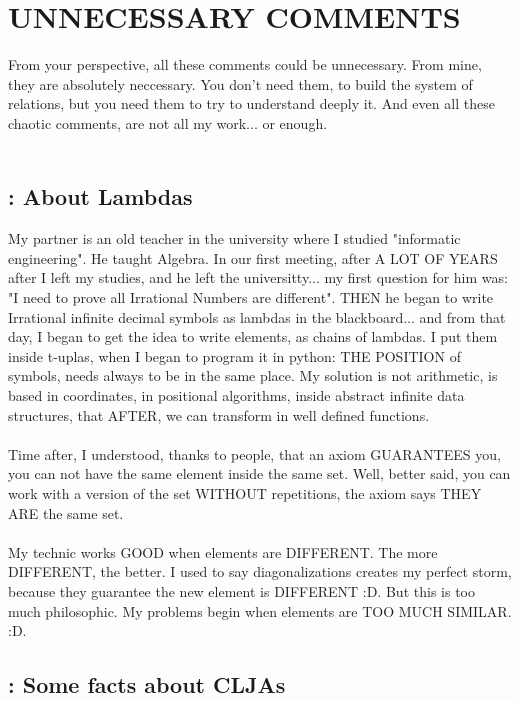 \chapter{UNNECESSARY COMMENTS}
	
	\noindent
	From your perspective, all these comments could be unnecessary. From mine, they are absolutely neccessary. You don't need them, to build the system of relations, but you need them to try to understand deeply it. And even all these chaotic comments, are not all my work... or enough.
	\\\\
	
	\section{\:: About Lambdas}
		
		\noindent
		My partner is an old teacher in the university where I studied "informatic engineering". He taught Algebra. In our first meeting, after A LOT OF YEARS after I left my studies, and he left the universitty... my first question for him was: "I need to prove all Irrational Numbers are different". THEN he began to write Irrational infinite decimal symbols as lambdas in the blackboard... and from that day, I began to get the idea to write elements, as chains of lambdas. I put them inside t-uplas, when I began to program it in python: THE POSITION of symbols, needs always to be in the same place. My solution is not arithmetic, is based in coordinates, in positional algorithms, inside abstract infinite data structures, that AFTER, we can transform in well defined functions.
		\\\\
		
		\noindent
		Time after, I understood, thanks to people, that an axiom GUARANTEES you, you can not have the same element inside the same set. Well, better said, you can work with a version of the set WITHOUT repetitions, the axiom says THEY ARE the same set.
		\\\\
		
		\noindent
		My technic works GOOD when elements are DIFFERENT. The more DIFFERENT, the better. I used to say diagonalizations creates my perfect storm, because they guarantee the new element is DIFFERENT :D. But this is too much philosophic. My problems begin when elements are TOO MUCH SIMILAR. :D.
		
	\section{\:: Some facts about CLJAs}
	
